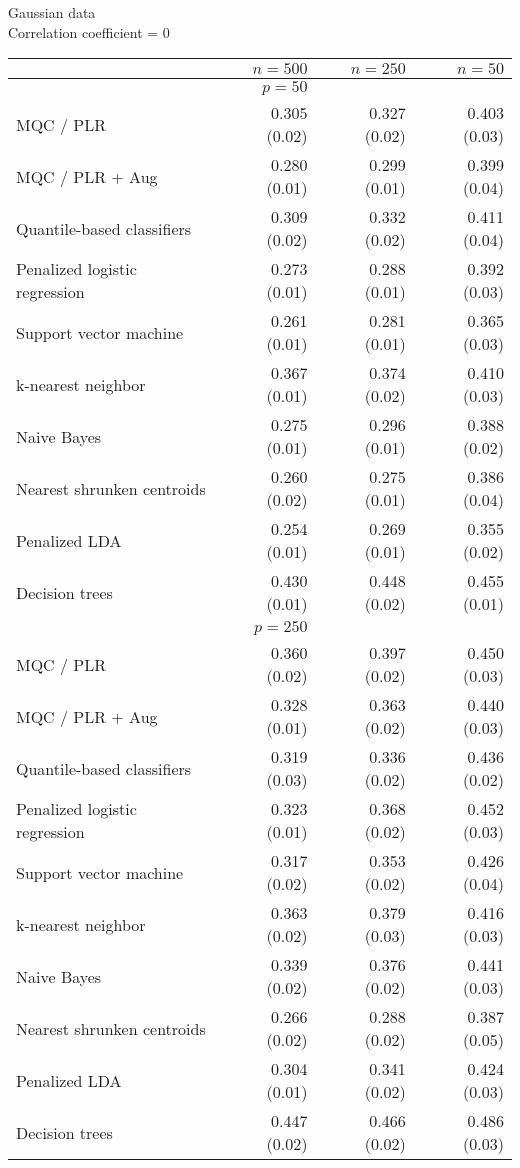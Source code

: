 

\begin{table}[p]
  \centering
  Gaussian data \\
  Correlation coefficient = 0 \\[2ex]
  \begin{adjustbox}{max size={\textwidth}{10cm}}
    \begin{tabular}{l@{\extracolsep{15mm}}rrr}
      
      \hline
      & $n=500$ & $n=250$ & $n=50$ \\ 
      \hline
      & $p = 50$ \\
      \hline

      MQC / PLR & 0.305 (0.02) & 0.327 (0.02) & 0.403 (0.03) \\ 
      MQC / PLR + Aug & 0.280 (0.01) & 0.299 (0.01) & 0.399 (0.04) \\ 
      Quantile-based classifiers & 0.309 (0.02) & 0.332 (0.02) & 0.411 (0.04) \\ 
      Penalized logistic regression & 0.273 (0.01) & 0.288 (0.01) & 0.392 (0.03) \\ 
      Support vector machine & 0.261 (0.01) & 0.281 (0.01) & 0.365 (0.03) \\ 
      k-nearest neighbor & 0.367 (0.01) & 0.374 (0.02) & 0.410 (0.03) \\ 
      Naive Bayes & 0.275 (0.01) & 0.296 (0.01) & 0.388 (0.02) \\ 
      Nearest shrunken centroids & 0.260 (0.02) & 0.275 (0.01) & 0.386 (0.04) \\ 
      Penalized LDA & 0.254 (0.01) & 0.269 (0.01) & 0.355 (0.02) \\ 
      Decision trees & 0.430 (0.01) & 0.448 (0.02) & 0.455 (0.01) \\ [2ex]

      \hline
      & $p = 250$ \\
      \hline

      MQC / PLR & 0.360 (0.02) & 0.397 (0.02) & 0.450 (0.03) \\ 
      MQC / PLR + Aug & 0.328 (0.01) & 0.363 (0.02) & 0.440 (0.03) \\ 
      Quantile-based classifiers & 0.319 (0.03) & 0.336 (0.02) & 0.436 (0.02) \\ 
      Penalized logistic regression & 0.323 (0.01) & 0.368 (0.02) & 0.452 (0.03) \\ 
      Support vector machine & 0.317 (0.02) & 0.353 (0.02) & 0.426 (0.04) \\ 
      k-nearest neighbor & 0.363 (0.02) & 0.379 (0.03) & 0.416 (0.03) \\ 
      Naive Bayes & 0.339 (0.02) & 0.376 (0.02) & 0.441 (0.03) \\ 
      Nearest shrunken centroids & 0.266 (0.02) & 0.288 (0.02) & 0.387 (0.05) \\ 
      Penalized LDA & 0.304 (0.01) & 0.341 (0.02) & 0.424 (0.03) \\ 
      Decision trees & 0.447 (0.02) & 0.466 (0.02) & 0.486 (0.03) \\ [2ex]


\end{tabular}
\end{adjustbox}
\end{table}
